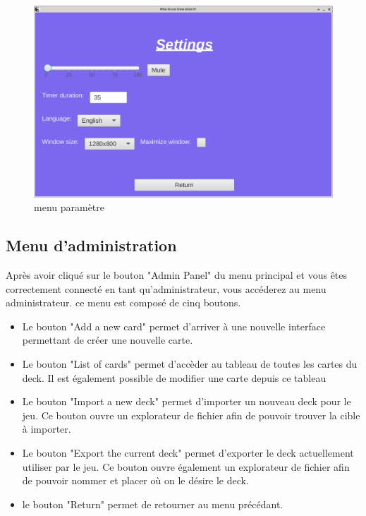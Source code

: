 \begin{figure}[h]
	\centering
	\includegraphics[width=\textwidth]{setting.png}
	\caption{menu paramètre}
	\label{fig:menu_setting}
\end{figure}

\newpage
\subsection{Menu d'administration}
Après avoir cliqué sur le bouton "Admin Panel" du menu principal et vous êtes correctement connecté en tant 
qu'administrateur, vous accéderez au menu administrateur. ce menu est composé de cinq boutons.
\begin{itemize}
	\item Le bouton "Add a new card" permet d'arriver à une nouvelle interface permettant de créer une nouvelle carte.
	\item Le bouton "List of cards" permet d'accèder au tableau de toutes les cartes du deck. Il est également possible de modifier une carte depuis ce tableau
	\item Le bouton "Import a new deck" permet d'importer un nouveau deck pour le jeu. Ce bouton ouvre un explorateur de fichier afin de pouvoir trouver la cible à importer.
	\item Le bouton "Export the current deck" permet d'exporter le deck actuellement utiliser par le jeu. Ce bouton ouvre également un explorateur de fichier afin de pouvoir nommer et placer où on le désire le deck.
	\item le bouton "Return" permet de retourner au menu précédant.
\end{itemize}

